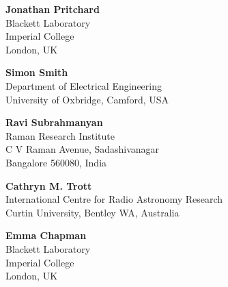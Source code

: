 {\noindent\textbf{Jonathan Pritchard}\\
Blackett Laboratory\\
Imperial College\\
London, UK

\noindent\textbf{Simon Smith}\\
Department of Electrical Engineering\\
University of Oxbridge,
Camford, USA

\noindent\textbf{Ravi Subrahmanyan}\\
Raman Research Institute\\
C V Raman Avenue, Sadashivanagar\\
Bangalore 560080, India

\noindent\textbf{Cathryn M. Trott}\\
International Centre for Radio Astronomy Research\\
Curtin University, Bentley WA, Australia

\noindent\textbf{Emma Chapman}\\
Blackett Laboratory\\
Imperial College\\
London, UK

}
